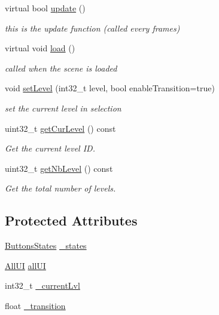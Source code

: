 \begin{DoxyCompactItemize}
virtual bool \hyperlink{class_scene_level_selection_a9784885da4583eaba695812bedf8847c}{update} ()
\begin{DoxyCompactList}\small\item\em this is the update function (called every frames) \end{DoxyCompactList}\item 
\mbox{\label{class_scene_level_selection_af16ace96ecc0c2bd2cee904de5f5733a}} 
virtual void \hyperlink{class_scene_level_selection_af16ace96ecc0c2bd2cee904de5f5733a}{load} ()
\begin{DoxyCompactList}\small\item\em called when the scene is loaded \end{DoxyCompactList}\item 
void \hyperlink{class_scene_level_selection_afbaae9b76f321067588bee9a63f89d3c}{set\+Level} (int32\+\_\+t level, bool enable\+Transition=true)
\begin{DoxyCompactList}\small\item\em set the current level in selection \end{DoxyCompactList}\item 
uint32\+\_\+t \hyperlink{class_scene_level_selection_a2ac8c1a5ac511ec2a048fd794f20f84b}{get\+Cur\+Level} () const
\begin{DoxyCompactList}\small\item\em Get the current level ID. \end{DoxyCompactList}\item 
uint32\+\_\+t \hyperlink{class_scene_level_selection_aedb8f99f461300aeadd7044c009f53e8}{get\+Nb\+Level} () const
\begin{DoxyCompactList}\small\item\em Get the total number of levels. \end{DoxyCompactList}\end{DoxyCompactItemize}
\subsection*{Protected Attributes}
\begin{DoxyCompactItemize}
\item 
\hyperlink{struct_scene_level_selection_1_1_buttons_states}{Buttons\+States} \hyperlink{class_scene_level_selection_a3e07eec156666992e39f5c5bef3bcd2a}{\+\_\+states}
\item 
\hyperlink{struct_scene_level_selection_1_1_all_u_i}{All\+UI} \hyperlink{class_scene_level_selection_a99db89c89f3cafb2161cfe5c38ed9fa3}{all\+UI}
\item 
int32\+\_\+t \hyperlink{class_scene_level_selection_afa1ff9c9029dd3226dbdc17c46b88081}{\+\_\+current\+Lvl}
\item 
float \hyperlink{class_scene_level_selection_a8933e75587039a89a300a7e68296db2d}{\+\_\+transition}
\end{DoxyCompactItemize}
